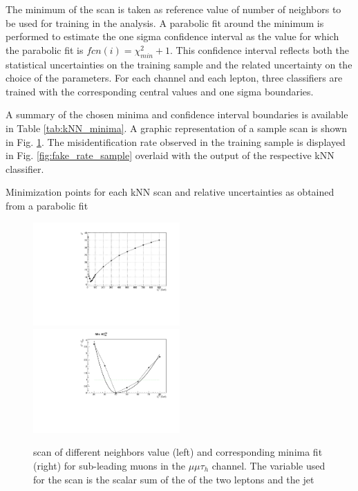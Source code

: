 The minimum of the scan is taken as reference value of number of neighbors to be used for training in the analysis. A parabolic fit around the minimum is performed to estimate the one sigma confidence interval as the value for which the parabolic fit is $fcn(i) = \chi^2_{min} + 1$. This confidence interval reflects both the statistical uncertainties on the training sample and the related uncertainty on the choice of the parameters. For each channel and each lepton, three classifiers are trained with the corresponding central values and one sigma boundaries.

A summary of the chosen minima and confidence interval boundaries is available in Table \ref{tab:kNN_minima}. A graphic representation of a sample scan is shown in Fig. \ref{fig:kNN_minima_sample}. The misidentification rate observed in the training sample is displayed in Fig. \ref{fig:fake_rate_sample} overlaid with the output of the respective kNN classifier.


\begin{table}

\caption{Minimization points for each kNN scan and relative uncertainties as obtained from a parabolic fit}

\label{tab:kNN_minima}
\end{table}

\begin{figure}
\includegraphics[width=0.5\textwidth]{4_Analisys/pics/8TeV/ProfileNeighbors/MM/h2taucuts020/LT_chi2.pdf}
\includegraphics[width=0.5\textwidth]{4_Analisys/pics/8TeV/ProfileNeighbors/MM/h2taucuts020_LT.pdf} \\
\caption{\chisq scan of different neighbors value (left) and corresponding minima fit (right) for sub-leading muons in the $\mu\mu\tau_h$ channel. The variable used for the scan is the scalar sum of the \pT of the two leptons and the jet}
\label{fig:kNN_minima_sample}
\end{figure}

